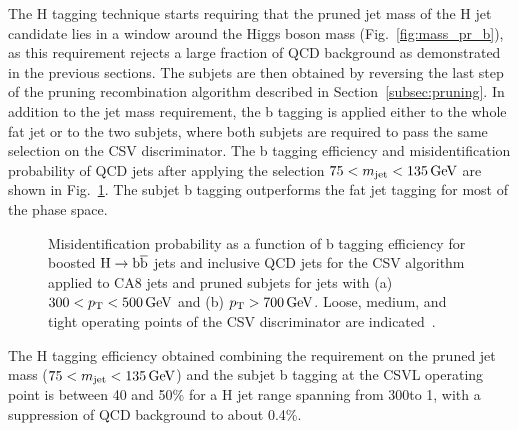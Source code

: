 The H tagging technique starts requiring that the pruned jet mass of the H jet candidate lies in a window around the Higgs boson mass (Fig.~\ref{fig:mass_pr_b}),
as this requirement rejects a large fraction of QCD background as demonstrated in the previous sections.
The subjets are then obtained by reversing the last step of the pruning recombination algorithm described in Section~\ref{subsec:pruning}.
In addition to the jet mass requirement, the b tagging is applied either to the whole fat jet or to the two subjets, where both subjets are required
to pass the same selection on the CSV discriminator. The b tagging efficiency and misidentification probability of QCD jets after applying the selection $75 < m_{\text{jet}} < 135\,\text{Ge\hspace{-.08em}V}$ are shown in Fig.~\ref{fig:htagging8TeV}.
The subjet b tagging outperforms the fat jet tagging for most of the phase space.

\begin{figure}[!htb]
\centering     %
{}
 \caption{Misidentification probability as a function of b tagging efficiency for boosted $\mathrm{H}\to{\mathrm{b}\overline{\mathrm{b}}}$ jets and inclusive QCD jets for the CSV algorithm applied to CA8 jets
 and pruned subjets for jets with (a) $300 < p_{\mathrm{T}} < 500\,\text{Ge\hspace{-.08em}V}$ and (b) $p_{\mathrm{T}} > 700\,\text{Ge\hspace{-.08em}V}$. Loose, medium, and tight operating points of the CSV discriminator are indicated~\cite{CMS:BTV13001}.}
\label{fig:htagging8TeV}
\end{figure}

The H tagging efficiency obtained combining the requirement on the pruned jet mass ($75 < m_{\text{jet}} < 135\,\text{Ge\hspace{-.08em}V}$)
and the subjet b tagging at the CSVL operating point is between 40 and 50\% for a H jet \pt range spanning from 300\GeV to 1\TeV,
with a suppression of QCD background to about 0.4\%.\\


